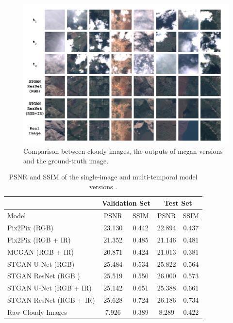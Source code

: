 \documentclass[../main.tex]{subfiles}
\begin{document}
\begin{figure}[H]
	\captionsetup{justification=centering}
	\centering
	\includegraphics[width=14cm]{imgs/relatedwork/conditional-multi-temporal.png}
	\caption{Comparison between cloudy images, the outputs of \gls{mcgan} versions and the ground-truth image.}
	\label{fig:related-cond-multi}
\end{figure}
{
	\renewcommand{\arraystretch}{1.5}%
	\begin{table}[H]
		\caption{PSNR and SSIM of the single-image and multi-temporal model versions .}
		\centering
		\begin{tabular}{l|cccc}
			&\multicolumn{2}{c}{Validation Set}&\multicolumn{2}{c}{Test Set}\\
			\hline\hline
			Model & PSNR & SSIM & PSNR & SSIM\\\hline
			Pix2Pix (RGB) & 23.130 & 0.442 & 22.894 & 0.437\\
			Pix2Pix (RGB + IR)& 21.352 & 0.485& 21.146& 0.481\\
			MCGAN (RGB + IR) & 20.871  & 0.424 & 21.013  & 0.381\\\hline
			STGAN U-Net (RGB) & 25.484 & 0.534 & 25.822 & 0.564\\
			STGAN ResNet (RGB )& 25.519 &  0.550 & 26.000 &  0.573\\
			STGAN U-Net (RGB + IR) & 25.142 & 0.651 & 25.388 &  0.661 \\
			STGAN ResNet (RGB + IR) & 25.628 & 0.724 & 26.186 & 0.734\\\hline
			Raw Cloudy Images & 7.926 & 0.389 & 8.289 & 0.422
		\end{tabular}
	\end{table}
}
\end{document}
